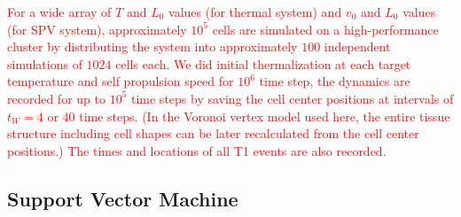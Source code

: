 \documentclass[twoside,twocolumn,9pt]{article}
\begin{document}
\textcolor{red}{For a wide array of $T$ and $L_0$ values (for thermal system) and $v_0$ and $L_0$ values (for SPV system), approximately $10^5$ cells are simulated on a high-performance cluster by distributing the system into approximately $100$ independent simulations of $1024$ cells each. We did  initial thermalization at each target temperature and self propulsion speed for $10^6$ time step, the dynamics are recorded for up to $10^5$ time steps by saving the cell center positions at intervals of $t_W = 4$ or 40 time steps. (In the Voronoi vertex model used here, the entire tissue structure including cell shapes can be later recalculated from the cell center positions.) The times and locations of all T1 events are also recorded.}




\subsection{Support Vector Machine}
\end{document}
